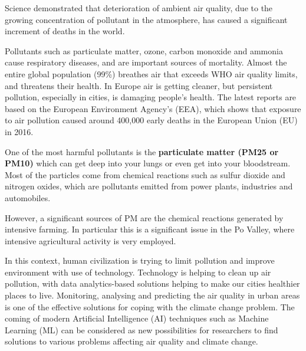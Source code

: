 Science demonstrated that deterioration of ambient air quality, due to the growing concentration of pollutant in the atmosphere, has caused a significant increment of deaths in the world.\par  
Pollutants such as particulate matter, ozone, carbon monoxide and ammonia cause respiratory diseases, and are important sources of mortality.
Almost the entire global population (99\%) breathes air that exceeds WHO air quality limits, and threatens their health.\newline
In Europe air is getting cleaner, but persistent pollution, especially in cities, is damaging people’s health. The latest reports are based on the European Environment Agency’s (EEA), which shows that exposure to air pollution caused around 400,000 early deaths in the European Union (EU) in 2016.\par
One of the most harmful pollutants is the \textbf{particulate matter (PM25 or PM10)} which can get deep into your lungs or even get into your bloodstream.\newline
Most of the particles come from chemical reactions such as sulfur dioxide and nitrogen oxides, which are pollutants emitted from power plants, industries and automobiles.\par
However, a significant sources of PM are the chemical reactions generated by intensive farming.
In particular this is a significant issue in the Po Valley, where intensive agricultural activity is very employed.\par
In this context, human civilization is trying to limit pollution and improve environment with use of technology.\newline
Technology is helping to clean up air pollution, with data analytics-based solutions helping to make our cities healthier places to live.\newline
Monitoring, analysing and predicting the air quality in urban areas is one of the effective solutions for coping with the climate change problem.\newline
The coming of modern Artificial Intelligence (AI) techniques such as Machine Learning (ML) can be considered as new possibilities for researchers to find solutions to various problems affecting air quality and climate change.

